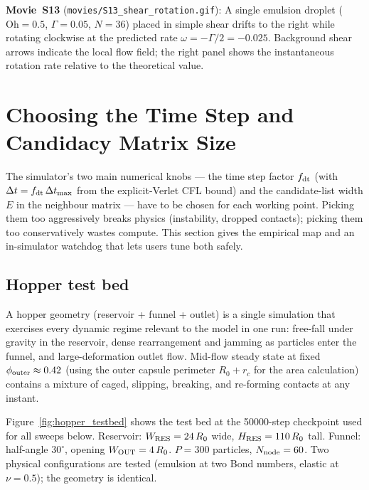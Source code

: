 \documentclass[aps,pre,twocolumn,floatfix,longbibliography]{revtex4-2}
\begin{document}
\textbf{Movie~S13} (\texttt{movies/S13\_shear\_rotation.gif}):
A single emulsion droplet ($\mathrm{Oh} = 0.5$, $\Gamma = 0.05$, $N = 36$)
placed in simple shear drifts to the right while rotating clockwise at the
predicted rate $\omega = -\Gamma/2 = -0.025$.  Background shear arrows indicate
the local flow field; the right panel shows the instantaneous rotation rate
relative to the theoretical value.

\section{Choosing the Time Step and Candidacy Matrix Size}
\label{sec:dt_and_E}

The simulator's two main numerical knobs --- the time step factor
$f_{\rm dt}$ (with $\Delta t = f_{\rm dt}\, \Delta t_{\rm max}$ from the
explicit-Verlet CFL bound) and the candidate-list width $E$ in the
neighbour matrix --- have to be chosen for each working point.  Picking
them too aggressively breaks physics (instability, dropped contacts);
picking them too conservatively wastes compute.  This section gives the
empirical map and an in-simulator watchdog that lets users tune both
safely.

\subsection{Hopper test bed}
\label{sec:dt_testbed}

A hopper geometry (reservoir + funnel + outlet) is a single simulation
that exercises every dynamic regime relevant to the model in one run:
free-fall under gravity in the reservoir, dense rearrangement and
jamming as particles enter the funnel, and large-deformation outlet
flow.  Mid-flow steady state at fixed $\phi_{\rm outer} \approx 0.42$
(using the outer capsule perimeter $R_0 + r_c$ for the area calculation)
contains a mixture of caged, slipping, breaking, and re-forming
contacts at any instant.

Figure~\ref{fig:hopper_testbed} shows the test bed at the 50000-step
checkpoint used for all sweeps below.  Reservoir: $W_{\rm RES} = 24\,R_0$
wide, $H_{\rm RES} = 110\,R_0$ tall.  Funnel: half-angle $30^\circ$,
opening $W_{\rm OUT} = 4\,R_0$.  $P = 300$ particles, $N_{\rm node} =
60$.  Two physical configurations are tested (emulsion at two Bond
numbers, elastic at $\nu = 0.5$); the geometry is identical.
\end{document}
